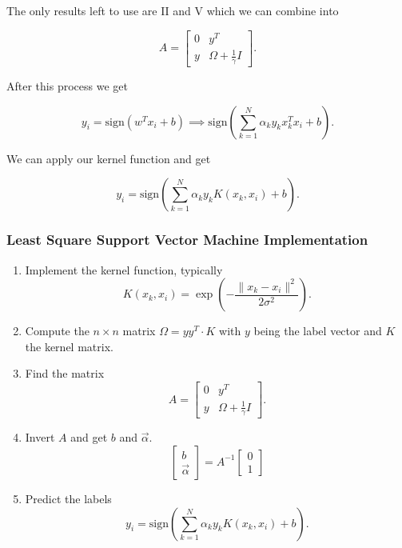 The only results left to use are II and V which we can combine into

\[
	A =
	\begin{bmatrix}
		0 & y^T                         \\
		y & \Omega + \frac{1}{\gamma} I
	\end{bmatrix}.
\]

After this process we get

\[
	y_i = \mathrm{sign}(w^T x_i + b) \implies \mathrm{sign}\left(\sum_{k = 1}^{N} \alpha_k y_k x_k^T x_i + b\right).
\]

We can apply our kernel function and get

\[
	y_i = \mathrm{sign}\left(\sum_{k = 1}^{N} \alpha_k y_k K(x_k, x_i) + b\right).
\]

\subsubsection{Least Square Support Vector Machine Implementation}

\begin{enumerate}

	\item Implement the kernel function, typically
	      \[
		      K(x_k, x_i) = \exp\left(- \frac{\|x_k - x_i\|^2}{2\sigma^2}\right).
	      \]

	\item Compute the \(n \times n\) matrix \(\Omega = yy^T \cdot K\) with \(y\) being the label vector and \(K\) the
	      kernel matrix.

	\item Find the matrix
	      \[
		      A =
		      \begin{bmatrix}
			      0 & y^T                         \\
			      y & \Omega + \frac{1}{\gamma} I
		      \end{bmatrix}.
	      \]

	\item Invert \(A\) and get \(b\) and \(\vec{\alpha}\).
	      \[
		      \begin{bmatrix}
			      b \\
			      \vec{\alpha}
		      \end{bmatrix}
		      =
		      A^{-1}
		      \begin{bmatrix}  0  \\ 1 \end{bmatrix}
	      \]

	\item Predict the labels
	      \[
		      y_i = \mathrm{sign}\left(\sum_{k = 1}^{N} \alpha_k y_k K(x_k, x_i) + b\right).
	      \]

\end{enumerate}

